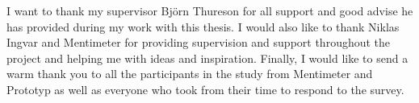 \begin{acks}
I want to thank my supervisor Björn Thureson for all support and good advise he has provided during my work with this thesis. 
I would also like to thank Niklas Ingvar and Mentimeter for providing supervision and support throughout the project and helping me with ideas and inspiration. 
Finally, I would like to send a warm thank you to all the participants in the study from Mentimeter and Prototyp as well as everyone who took from their time to respond to the survey.
\end{acks}